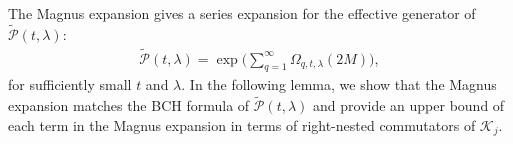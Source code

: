 \documentclass[11pt]{article}
\renewcommand{\i}{\mathrm{i}}
\newcommand{\ad}{\mathrm{ad}}
\renewcommand{\P}{\mathcal{P}}
\newcommand{\A}{\mathcal{A}}
\newcommand{\mc}{\mathcal}
\begin{document}
The Magnus expansion gives a series expansion for the effective generator of $\tilde{\P}(t,\lambda)$:
\begin{align}
\label{eq:bch}
    \tilde{\P}(t,\lambda) = \exp\bigg( \sum_{q=1}^{\infty} \Omega_{q,t,\lambda}(2M) \bigg),
\end{align}
for sufficiently small $t$ and $\lambda$. %
In the following lemma, we show that the Magnus expansion matches the BCH formula of $ \tilde{\P}(t,\lambda)$ and provide an upper bound of each term in the Magnus expansion in terms of right-nested commutators of $\mc K_j$.
\end{document}
